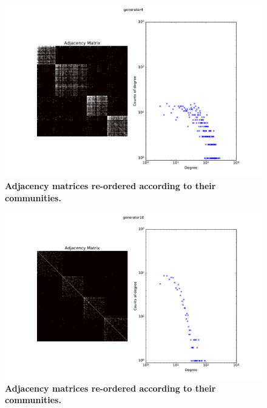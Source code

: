 \begin{figure}[h]
	\centering
	\includegraphics[scale=0.25]{img/Graph4}
	\caption{\textbf{Adjacency matrices re-ordered according to their communities.}}
	\label{fig:}
\end{figure}
\begin{figure}[h]
	\centering
	\includegraphics[scale=0.25]{img/Graph10}
	\caption{\textbf{Adjacency matrices re-ordered according to their communities.}}
	\label{fig:}
\end{figure}
%
%
%	
%
%

\clearpage
